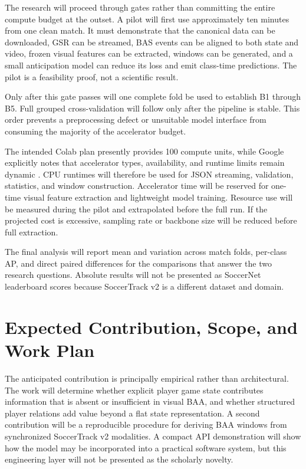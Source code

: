 \documentclass[11pt,a4paper]{article}
\begin{document}
The research will proceed through gates rather than committing the entire compute budget at the outset. A pilot will first use approximately ten minutes from one clean match. It must demonstrate that the canonical data can be downloaded, GSR can be streamed, BAS events can be aligned to both state and video, frozen visual features can be extracted, windows can be generated, and a small anticipation model can reduce its loss and emit class-time predictions. The pilot is a feasibility proof, not a scientific result.

Only after this gate passes will one complete fold be used to establish B1 through B5. Full grouped cross-validation will follow only after the pipeline is stable. This order prevents a preprocessing defect or unsuitable model interface from consuming the majority of the accelerator budget.

The intended Colab plan presently provides 100 compute units, while Google explicitly notes that accelerator types, availability, and runtime limits remain dynamic \cite{colabPricing,colabFAQ}. CPU runtimes will therefore be used for JSON streaming, validation, statistics, and window construction. Accelerator time will be reserved for one-time visual feature extraction and lightweight model training. Resource use will be measured during the pilot and extrapolated before the full run. If the projected cost is excessive, sampling rate or backbone size will be reduced before full extraction.

The final analysis will report mean and variation across match folds, per-class AP, and direct paired differences for the comparisons that answer the two research questions. Absolute results will not be presented as SoccerNet leaderboard scores because SoccerTrack v2 is a different dataset and domain.

\section{Expected Contribution, Scope, and Work Plan}

The anticipated contribution is principally empirical rather than architectural. The work will determine whether explicit player game state contributes information that is absent or insufficient in visual BAA, and whether structured player relations add value beyond a flat state representation. A second contribution will be a reproducible procedure for deriving BAA windows from synchronized SoccerTrack v2 modalities. A compact API demonstration will show how the model may be incorporated into a practical software system, but this engineering layer will not be presented as the scholarly novelty.
\end{document}
